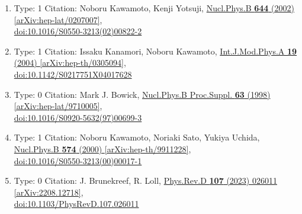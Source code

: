 \documentclass[a4paper,10pt]{article}
\begin{document}
\begin{enumerate}
\begin{enumerate}
  \item Type: 1 Citation: Noboru Kawamoto, Kenji Yotsuji, \href{https://www.doi.org/10.1016/S0550-3213(02)00822-2}{Nucl.Phys.B {\bf 644} (2002) }  \href{https://arxiv.org/abs/hep-lat/0207007}{[arXiv:hep-lat/0207007]},\\\href{https://www.doi.org/10.1016/S0550-3213(02)00822-2}{doi:10.1016/S0550-3213(02)00822-2}
  \item Type: 1 Citation: Issaku Kanamori, Noboru Kawamoto, \href{https://www.doi.org/10.1142/S0217751X04017628}{Int.J.Mod.Phys.A {\bf 19} (2004) }  \href{https://arxiv.org/abs/hep-th/0305094}{[arXiv:hep-th/0305094]},\\\href{https://www.doi.org/10.1142/S0217751X04017628}{doi:10.1142/S0217751X04017628}
  \item Type: 0 Citation: Mark J. Bowick, \href{https://www.doi.org/10.1016/S0920-5632(97)00699-3}{Nucl.Phys.B Proc.Suppl. {\bf 63} (1998) }  \href{https://arxiv.org/abs/hep-lat/9710005}{[arXiv:hep-lat/9710005]},\\\href{https://www.doi.org/10.1016/S0920-5632(97)00699-3}{doi:10.1016/S0920-5632(97)00699-3}
  \item Type: 1 Citation: Noboru Kawamoto, Noriaki Sato, Yukiya Uchida, \href{https://www.doi.org/10.1016/S0550-3213(00)00017-1}{Nucl.Phys.B {\bf 574} (2000) }  \href{https://arxiv.org/abs/hep-th/9911228}{[arXiv:hep-th/9911228]},\\\href{https://www.doi.org/10.1016/S0550-3213(00)00017-1}{doi:10.1016/S0550-3213(00)00017-1}
  \item Type: 0 Citation: J. Brunekreef, R. Loll, \href{https://www.doi.org/10.1103/PhysRevD.107.026011}{Phys.Rev.D {\bf 107} (2023) 026011}  \href{https://arxiv.org/abs/2208.12718}{[arXiv:2208.12718]},\\\href{https://www.doi.org/10.1103/PhysRevD.107.026011}{doi:10.1103/PhysRevD.107.026011}

\end{enumerate}
\end{enumerate}
\end{document}
